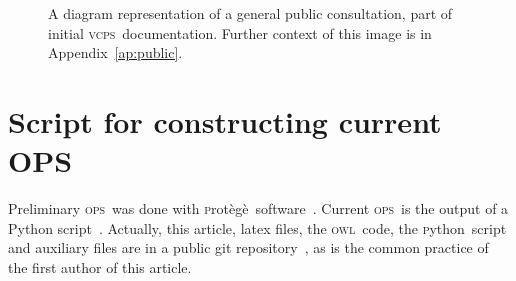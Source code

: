 \documentclass[10pt,letterpaper]{article}
\newcommand{\ops}{\textsc{ops}}
\newcommand{\vcps}{\textsc{vcps}}
\newcommand{\owl}{\textsc{owl}}
\newcommand{\python}{\textsc{p}ython}
\newcommand{\protege}{\textsc{p}rot\`eg\`e}
\begin{document}
\begin{figure}[H]
    \centering
    \caption{A diagram representation of a general public consultation, part of initial \vcps\ documentation. Further context of this image is in Appendix~\ref{ap:public}.}
    \label{fig:consult}
\end{figure}

\section{Script for constructing current OPS}\label{ap:script}
Preliminary \ops\ was done with \protege\ software~\cite{protege}. Current \ops\ is the output of a Python script~\cite{opsScript}. Actually, this article, latex files, the \owl\ code, the \python\ script and auxiliary files are in a public git repository~\cite{opsRepo}, as is the common practice of the first author of this article.

 


\end{document}
